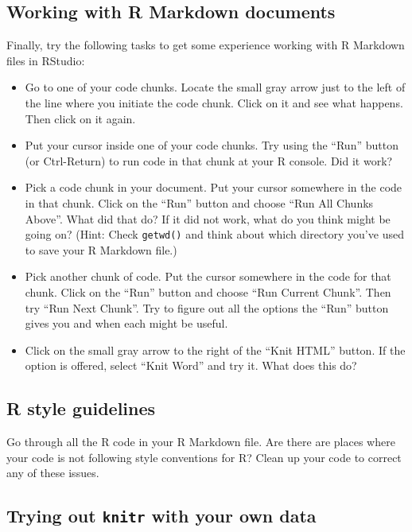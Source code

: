 \documentclass[]{book}
\providecommand{\tightlist}{%
  \setlength{\itemsep}{0pt}\setlength{\parskip}{0pt}}
\theoremstyle{definition}
\theoremstyle{definition}
\theoremstyle{definition}
\theoremstyle{remark}
\begin{document}
\subsection{Working with R Markdown
documents}\label{working-with-r-markdown-documents}

Finally, try the following tasks to get some experience working with R
Markdown files in RStudio:

\begin{itemize}
\tightlist
\item
  Go to one of your code chunks. Locate the small gray arrow just to the
  left of the line where you initiate the code chunk. Click on it and
  see what happens. Then click on it again.
\item
  Put your cursor inside one of your code chunks. Try using the ``Run''
  button (or Ctrl-Return) to run code in that chunk at your R console.
  Did it work?
\item
  Pick a code chunk in your document. Put your cursor somewhere in the
  code in that chunk. Click on the ``Run'' button and choose ``Run All
  Chunks Above''. What did that do? If it did not work, what do you
  think might be going on? (Hint: Check \texttt{getwd()} and think about
  which directory you've used to save your R Markdown file.)
\item
  Pick another chunk of code. Put the cursor somewhere in the code for
  that chunk. Click on the ``Run'' button and choose ``Run Current
  Chunk''. Then try ``Run Next Chunk''. Try to figure out all the
  options the ``Run'' button gives you and when each might be useful.
\item
  Click on the small gray arrow to the right of the ``Knit HTML''
  button. If the option is offered, select ``Knit Word'' and try it.
  What does this do?
\end{itemize}

\subsection{R style guidelines}\label{r-style-guidelines}

Go through all the R code in your R Markdown file. Are there are places
where your code is not following style conventions for R? Clean up your
code to correct any of these issues.

\subsection{\texorpdfstring{Trying out \texttt{knitr} with your own
data}{Trying out knitr with your own data}}\label{trying-out-knitr-with-your-own-data}
\end{document}
